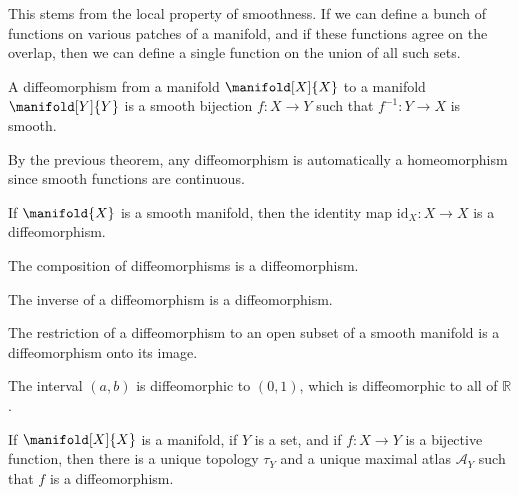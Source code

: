 \documentclass{article}                                                        %
\begin{document}
            This stems from the local property of smoothness. If we can define
            a bunch of functions on various patches of a manifold, and if these
            functions agree on the overlap, then we can define a single function
            on the union of all such sets.
            \begin{definition}
                A diffeomorphism from a manifold $\manifold[X]{X}$ to a manifold
                $\manifold[Y]{Y}$ is a smooth bijection $f:X\rightarrow{Y}$
                such that $f^{\minus{1}}:Y\rightarrow{X}$ is smooth.
            \end{definition}
            By the previous theorem, any diffeomorphism is automatically a
            homeomorphism since smooth functions are continuous.
            \begin{theorem}
                If $\manifold{X}$ is a smooth manifold, then the identity map
                $\textrm{id}_{X}:X\rightarrow{X}$ is a diffeomorphism.
            \end{theorem}
            \begin{theorem}
                The composition of diffeomorphisms is a diffeomorphism.
            \end{theorem}
            \begin{theorem}
                The inverse of a diffeomorphism is a diffeomorphism.
            \end{theorem}
            \begin{theorem}
                The restriction of a diffeomorphism to an open subset of a
                smooth manifold is a diffeomorphism onto its image.
            \end{theorem}
            \begin{example}
                The interval $(a,b)$ is diffeomorphic to $(0,1)$, which is
                diffeomorphic to all of $\mathbb{R}$.
            \end{example}
            \begin{theorem}
                If $\manifold[X]{X}$ is a manifold, if $Y$ is a set, and if
                $f:X\rightarrow{Y}$ is a bijective function, then there is a
                unique topology $\tau_{Y}$ and a unique maximal atlas
                $\mathcal{A}_{Y}$ such that $f$ is a diffeomorphism.
            \end{theorem}
\end{document}
